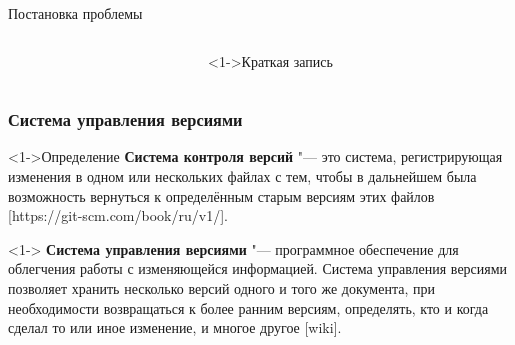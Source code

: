 \documentclass[pdf,9pt,aspectratio=169]{beamer}
\begin{document}
\begin{frame}{Постановка проблемы}
\begin{columns}[T]
\begin{column}[]{0.65\textwidth}
\begin{exampleblock}
\begin{center}
        \end{center}
      \end{exampleblock}
    \end{column}
    \begin{column}[]{0.3\textwidth}  
      \begin{block}<1->{Краткая запись}
        \begin{center}
        \end{center}
      \end{block}
    \end{column}
  \end{columns}
\end{frame}

\begin{frame}\frametitle{Система управления версиями}
  \begin{block}<1->{Определение}
    \textbf{Система контроля версий} "---  это система, регистрирующая изменения в одном или нескольких файлах с тем, чтобы в дальнейшем была возможность вернуться к определённым старым версиям этих файлов [https://git-scm.com/book/ru/v1/]. 
  \end{block}
  \begin{block}<1->{}
    \textbf{Система управления версиями} "---   программное обеспечение для облегчения работы с изменяющейся информацией. Система управления версиями позволяет хранить несколько версий одного и того же документа, при необходимости возвращаться к более ранним версиям, определять, кто и когда сделал то или иное изменение, и многое другое [wiki]. 
  \end{block}
\end{frame}
\end{document}
